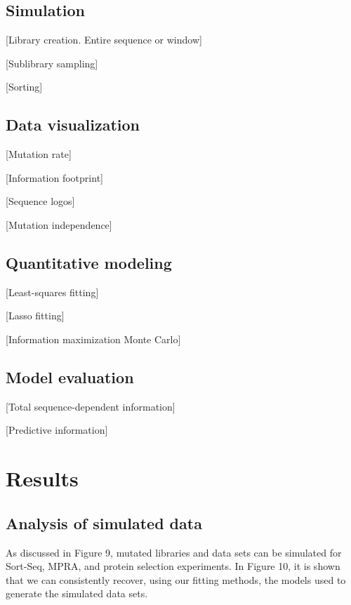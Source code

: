\documentclass{bmcart}
\begin{document}
\subsection*{Simulation}

[Library creation. Entire sequence or window]

[Sublibrary sampling]

[Sorting]

\subsection*{Data visualization}

[Mutation rate]

[Information footprint]

[Sequence logos]

[Mutation independence]

\subsection*{Quantitative modeling}

[Least-squares fitting]

[Lasso fitting]

[Information maximization Monte Carlo]

\subsection*{Model evaluation}

[Total sequence-dependent information]

[Predictive information]

\section*{Results} %

\subsection*{Analysis of simulated data}

    As discussed in Figure 9, mutated libraries and data sets can be simulated for
Sort-Seq, MPRA, and protein selection experiments. In Figure 10, it is shown that we can
consistently recover, using our fitting methods, the models used to generate the
simulated data sets.
\end{document}
